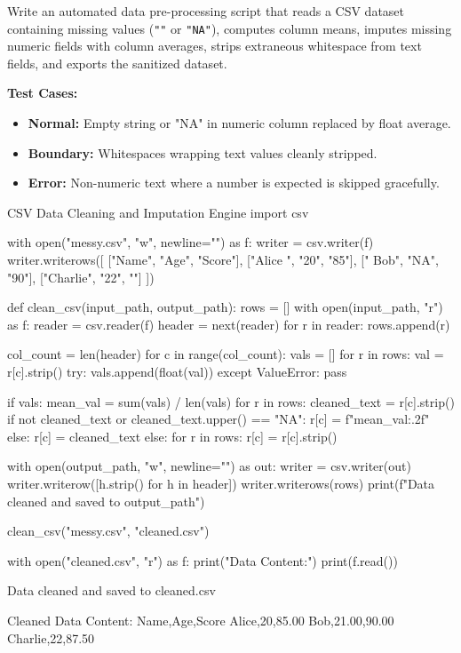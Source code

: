 \begin{practiceset}
Write an automated data pre-processing script that reads a CSV dataset containing missing values (\texttt{""} or \texttt{"NA"}), computes column means, imputes missing numeric fields with column averages, strips extraneous whitespace from text fields, and exports the sanitized dataset.

\textbf{Test Cases:}
\begin{itemize}
    \item \textbf{Normal:} Empty string or "NA" in numeric column replaced by float average.
    \item \textbf{Boundary:} Whitespaces wrapping text values cleanly stripped.
    \item \textbf{Error:} Non-numeric text where a number is expected is skipped gracefully.
\end{itemize}
\end{practiceset}

\begin{pythoncode}{CSV Data Cleaning and Imputation Engine}
import csv

with open("messy.csv", "w", newline="") as f:
    writer = csv.writer(f)
    writer.writerows([
        ["Name", "Age", "Score"],
        ["Alice ", "20", "85"],
        [" Bob", "NA", "90"],
        ["Charlie", "22", ""]
    ])

def clean_csv(input_path, output_path):
    rows = []
    with open(input_path, "r") as f:
        reader = csv.reader(f)
        header = next(reader)
        for r in reader:
            rows.append(r)

    col_count = len(header)
    for c in range(col_count):
        vals = []
        for r in rows:
            val = r[c].strip()
            try:
                vals.append(float(val))
            except ValueError:
                pass
        
        if vals:
            mean_val = sum(vals) / len(vals)
            for r in rows:
                cleaned_text = r[c].strip()
                if not cleaned_text or cleaned_text.upper() == "NA":
                    r[c] = f"{mean_val:.2f}"
                else:
                    r[c] = cleaned_text
        else:
            for r in rows:
                r[c] = r[c].strip()

    with open(output_path, "w", newline="") as out:
        writer = csv.writer(out)
        writer.writerow([h.strip() for h in header])
        writer.writerows(rows)
    print(f"Data cleaned and saved to {output_path}")

clean_csv("messy.csv", "cleaned.csv")

with open("cleaned.csv", "r") as f:
    print("\nCleaned Data Content:")
    print(f.read())
\end{pythoncode}

\begin{outputbox}
Data cleaned and saved to cleaned.csv

Cleaned Data Content:
Name,Age,Score
Alice,20,85.00
Bob,21.00,90.00
Charlie,22,87.50
\end{outputbox}

